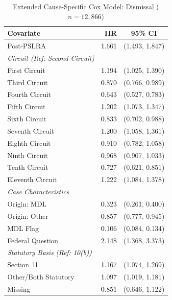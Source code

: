 \begin{table}[htbp]
\centering
\caption[Extended Cause-Specific Cox Model: Dismissal]{Extended Cause-Specific Cox Model: Dismissal ($n = 12{,}866$)}
\label{tab:cox_ext_dismiss}
\renewcommand{\arraystretch}{1.2}
\begin{tabular*}{\textwidth}{@{\extracolsep{\fill}} l r c @{}}
\toprule
\textbf{Covariate} & \textbf{HR} & \textbf{95\% CI} \\
\midrule
Post-PSLRA            & 1.661 & (1.493, 1.847) \\
\addlinespace[0.5em]
\textit{Circuit (Ref: Second Circuit)} & & \\
First Circuit         & 1.194 & (1.025, 1.390) \\
Third Circuit         & 0.870 & (0.766, 0.989) \\
Fourth Circuit        & 0.643 & (0.527, 0.783) \\
Fifth Circuit         & 1.202 & (1.073, 1.347) \\
Sixth Circuit         & 0.833 & (0.702, 0.988) \\
Seventh Circuit       & 1.200 & (1.058, 1.361) \\
Eighth Circuit        & 0.910 & (0.782, 1.058) \\
Ninth Circuit         & 0.968 & (0.907, 1.033) \\
Tenth Circuit         & 0.727 & (0.621, 0.851) \\
Eleventh Circuit      & 1.222 & (1.084, 1.378) \\
\addlinespace[0.5em]
\textit{Case Characteristics} & & \\
Origin: MDL           & 0.323 & (0.261, 0.400) \\
Origin: Other         & 0.857 & (0.777, 0.945) \\
MDL Flag              & 0.106 & (0.084, 0.134) \\
Federal Question      & 2.148 & (1.368, 3.373) \\
\addlinespace[0.5em]
\textit{Statutory Basis (Ref: 10(b))} & & \\
Section 11            & 1.167 & (1.074, 1.269) \\
Other/Both Statutory  & 1.097 & (1.019, 1.181) \\
Missing               & 0.851 & (0.646, 1.122) \\
\bottomrule
\end{tabular*}
\end{table}

